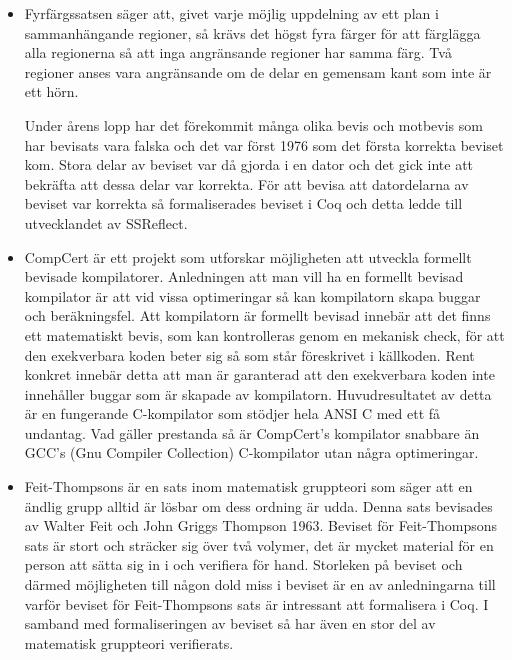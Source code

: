\begin{itemize}

\item Fyrfärgssatsen\autocite{gonthier2008formal} säger att, givet varje möjlig
uppdelning av ett plan i sammanhängande regioner, så krävs det högst fyra
färger för att färglägga alla regionerna så att inga angränsande regioner har
samma färg. Två regioner anses vara angränsande om de delar en gemensam kant
som inte är ett hörn.

Under årens lopp har det förekommit många olika bevis och motbevis som har
bevisats vara falska och  det var först 1976 som det första korrekta beviset
kom. Stora delar av beviset var då gjorda i en dator och det gick inte att
bekräfta att dessa delar var korrekta. För att bevisa att datordelarna av
beviset var korrekta så formaliserades beviset i Coq och detta ledde till
utvecklandet av SSReflect.

\item CompCert\autocite{compcert} är ett projekt som utforskar möjligheten att
utveckla formellt bevisade kompilatorer. Anledningen att man vill ha en
formellt bevisad kompilator är att vid vissa optimeringar så kan kompilatorn
skapa buggar och beräkningsfel. Att kompilatorn är formellt bevisad innebär att
det finns ett matematiskt bevis, som kan kontrolleras genom en mekanisk check,
för att den exekverbara koden beter sig så som står föreskrivet i källkoden.
Rent konkret innebär detta att man är garanterad att den exekverbara koden inte
innehåller buggar som är skapade av kompilatorn. Huvudresultatet av detta
är en fungerande C-kompilator som stödjer hela ANSI C med ett få undantag.
Vad gäller prestanda så är CompCert's kompilator snabbare än
GCC's (Gnu Compiler Collection) C-kompilator utan några optimeringar.

\item Feit-Thompsons är en sats inom matematisk gruppteori som säger att en
ändlig grupp alltid är lösbar om dess ordning är
udda\cite{aschbacher2004status}. Denna sats bevisades av Walter Feit och John
Griggs Thompson 1963. Beviset för Feit-Thompsons sats är stort och sträcker sig
över två volymer, det är mycket material för en person att sätta sig in i och
verifiera för hand. Storleken på beviset och därmed möjligheten till någon dold
miss i beviset är en av anledningarna till varför beviset för Feit-Thompsons
sats är intressant att formalisera i Coq. I samband med formaliseringen av
beviset så har även en stor del av matematisk gruppteori verifierats.

\end{itemize}

